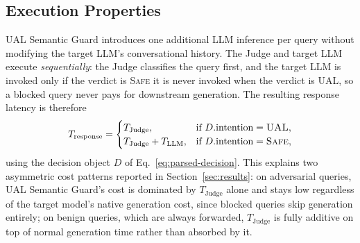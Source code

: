 \subsection{Execution Properties}
\label{subsec:execution}

UAL Semantic Guard introduces one additional LLM inference per query without modifying the target LLM's conversational history. The Judge and target LLM execute \emph{sequentially}: the Judge classifies the query first, and the target LLM is invoked only if the verdict is \textsc{Safe} it is never invoked when the verdict is \textsc{UAL}, so a blocked query never pays for downstream generation. The resulting response latency is therefore
\begin{equation}
T_{\text{response}} =
\begin{cases}
T_{\text{Judge}}, & \text{if } D.\text{intention}=\textsc{UAL},\\
T_{\text{Judge}} + T_{\text{LLM}}, & \text{if } D.\text{intention}=\textsc{Safe},
\end{cases}
\label{eq:latency}
\end{equation}
using the decision object $D$ of Eq.~\eqref{eq:parsed-decision}. This explains two asymmetric cost patterns reported in Section~\ref{sec:results}: on adversarial queries, UAL Semantic Guard's cost is dominated by $T_{\text{Judge}}$ alone and stays low regardless of the target model's native generation cost, since blocked queries skip generation entirely; on benign queries, which are always forwarded, $T_{\text{Judge}}$ is fully additive on top of normal generation time rather than absorbed by it.
